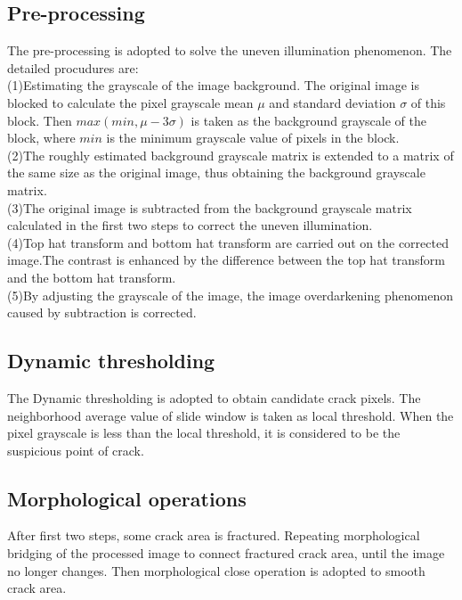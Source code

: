 \documentclass[twocolumn]{article}
\begin{document}
        \subsection{Pre-processing}
        The pre-processing is adopted to solve the uneven illumination phenomenon. The detailed procudures are:\\
        (1)Estimating the grayscale of the image background. The original image is blocked to calculate the pixel grayscale mean $\mu$ and standard deviation $\sigma$ of this block.
        Then $ max(min,\mu - 3\sigma) $ is taken as the background grayscale of the block, where $min$ is the minimum grayscale value of pixels in the block.\\
        (2)The roughly estimated background grayscale matrix is extended to a matrix of the same size as the original image, thus obtaining the background grayscale matrix.\\
        (3)The original image is subtracted from the background grayscale matrix calculated in the first two steps to correct the uneven illumination.\\
        (4)Top hat transform and bottom hat transform are carried out on the corrected image.The contrast is enhanced by the difference between the top hat transform and the bottom hat transform.\\
        (5)By adjusting the grayscale of the image, the image overdarkening phenomenon caused by subtraction is corrected.\\
        
        \subsection{Dynamic thresholding}
        The Dynamic thresholding is adopted to obtain candidate crack pixels. The neighborhood average value of slide window is taken as local threshold. 
        When the pixel grayscale is less than the local threshold, it is considered to be the suspicious point of crack.\\

        \subsection{Morphological operations}
        After first two steps, some crack area is fractured. Repeating morphological bridging of the processed image to connect fractured crack area, until the image no longer changes. 
        Then morphological close operation is adopted to smooth crack area.\\
\end{document}
